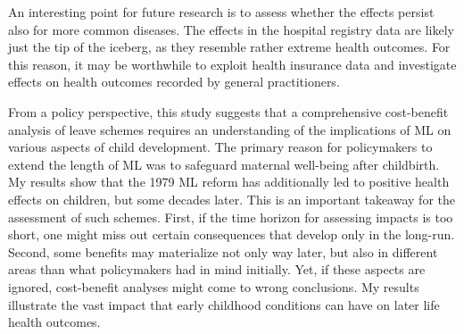 \documentclass[11pt, a4paper, draft]{article} %
\begin{document}
An interesting point for future research is to assess whether the effects persist also for more common diseases. The effects in the hospital registry data are likely just the tip of the iceberg, as they resemble rather extreme health outcomes. For this reason, it may be worthwhile to exploit health insurance data and investigate effects on health outcomes recorded by general practitioners.



From a policy perspective, this study suggests that a comprehensive cost-benefit analysis of leave schemes requires an understanding of the implications of ML on various aspects of child development. The primary reason for policymakers to extend the length of ML was to safeguard maternal well-being after childbirth. My results show that the 1979 ML reform has additionally led to positive health effects on children, but some decades later. This is an important takeaway for the assessment of such schemes. First, if the time horizon for assessing impacts is too short, one might miss out certain consequences that develop only in the long-run. Second, some benefits may materialize not only way later, but also in different areas than what policymakers had in mind initially. Yet, if these aspects are ignored, cost-benefit analyses might come to wrong conclusions. My results illustrate the vast impact that early childhood conditions can have on later life health outcomes. 


 
 

 
 

 





\newpage




\end{document}
